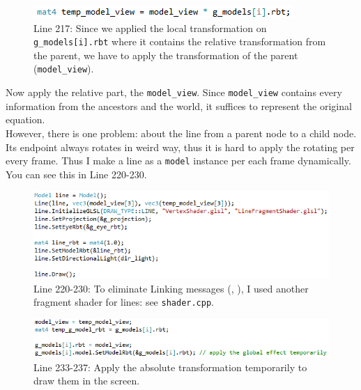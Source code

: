 \documentclass[11pt]{article}
\begin{document}
\begin{figure}[htb]
	\begin{center}
		\includegraphics[width=0.8\linewidth]{applyParentTransformation.png}
	\end{center}
	\caption{Line 217: Since we applied the local transformation on \texttt{g\_models[i].rbt} where it contains the relative transformation from the parent, we have to apply the transformation of the parent (\texttt{model\_view}).}
\end{figure}
Now apply the relative part, the \texttt{model\_view}. Since \texttt{model\_view} contains every information from the ancestors and the world, it suffices to represent the original equation. \\
However, there is one problem: about the line from a parent node to a child node. Its endpoint always rotates in weird way, thus it is hard to apply the rotating per every frame. Thus I make a line as a \texttt{model} instance per each frame dynamically. You can see this in Line 220-230.
\begin{figure}[htb]
	\begin{center}
		\includegraphics[width=1.0\linewidth]{lineGenerator.png}
	\end{center}
	\caption{Line 220-230: To eliminate Linking messages (, ), I used another fragment shader for lines: see \texttt{shader.cpp}.}
\end{figure}
\begin{figure}[htb]
	\begin{center}
		\includegraphics[width=0.9\linewidth]{temporalAbsoluteTransformation.png}
	\end{center}
	\caption{Line 233-237: Apply the absolute transformation temporarily to draw them in the screen.}
\end{figure}
\end{document}
